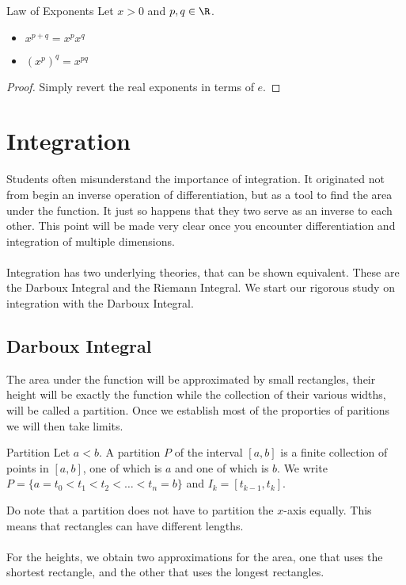 \begin{thm}{Law of Exponents}{} Let $x>0$ and $p,q\in\R$. 
\begin{itemize}
\item $x^{p+q}=x^px^q$
\item $(x^p)^q=x^{pq}$
\end{itemize}\tcbline
\begin{proof} Simply revert the real exponents in terms of $e$. 
\end{proof}
\end{thm}

\pagebreak
\section{Integration}
Students often misunderstand the importance of integration. It originated not from begin an inverse operation of differentiation, but as a tool to find the area under the function. It just so happens that they two serve as an inverse to each other. This point will be made very clear once you encounter differentiation and integration of multiple dimensions. \\~\\
Integration has two underlying theories, that can be shown equivalent. These are the Darboux Integral and the Riemann Integral. We start our rigorous study on integration with the Darboux Integral. 
\subsection{Darboux Integral}
The area under the function will be approximated by small rectangles, their height will be exactly the function while the collection of their various widths, will be called a partition. Once we establish most of the proporties of paritions we will then take limits. 
\begin{defn}{Partition}{} Let $a<b$. A partition $P$ of the interval $[a,b]$ is a finite collection of points in $[a,b]$, one of which is $a$ and one of which is $b$. We write $P=\{a=t_0<t_1<t_2<\dots<t_n=b\}$ and $I_k=[t_{k-1},t_k]$. 
\end{defn}

Do note that a partition does not have to partition the $x$-axis equally. This means that rectangles can have different lengths. \\~\\
For the heights, we obtain two approximations for the area, one that uses the shortest rectangle, and the other that uses the longest rectangles. 


